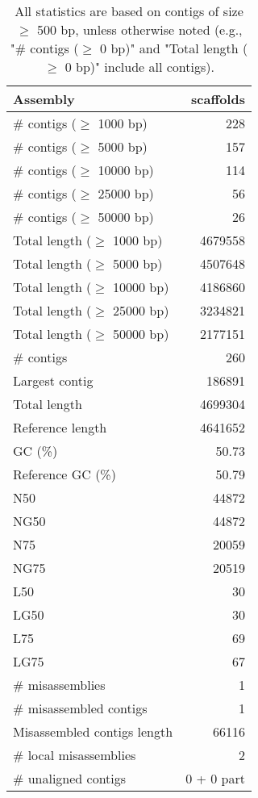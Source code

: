 \documentclass[12pt,a4paper]{article}
\begin{document}
\begin{table}[ht]
\begin{center}
\caption{All statistics are based on contigs of size $\geq$ 500 bp, unless otherwise noted (e.g., "\# contigs ($\geq$ 0 bp)" and "Total length ($\geq$ 0 bp)" include all contigs).}
\begin{tabular}{|l*{1}{|r}|}
\hline
Assembly & scaffolds \\ \hline
\# contigs ($\geq$ 1000 bp) & 228 \\ \hline
\# contigs ($\geq$ 5000 bp) & 157 \\ \hline
\# contigs ($\geq$ 10000 bp) & 114 \\ \hline
\# contigs ($\geq$ 25000 bp) & 56 \\ \hline
\# contigs ($\geq$ 50000 bp) & 26 \\ \hline
Total length ($\geq$ 1000 bp) & 4679558 \\ \hline
Total length ($\geq$ 5000 bp) & 4507648 \\ \hline
Total length ($\geq$ 10000 bp) & 4186860 \\ \hline
Total length ($\geq$ 25000 bp) & 3234821 \\ \hline
Total length ($\geq$ 50000 bp) & 2177151 \\ \hline
\# contigs & 260 \\ \hline
Largest contig & 186891 \\ \hline
Total length & 4699304 \\ \hline
Reference length & 4641652 \\ \hline
GC (\%) & 50.73 \\ \hline
Reference GC (\%) & 50.79 \\ \hline
N50 & 44872 \\ \hline
NG50 & 44872 \\ \hline
N75 & 20059 \\ \hline
NG75 & 20519 \\ \hline
L50 & 30 \\ \hline
LG50 & 30 \\ \hline
L75 & 69 \\ \hline
LG75 & 67 \\ \hline
\# misassemblies & 1 \\ \hline
\# misassembled contigs & 1 \\ \hline
Misassembled contigs length & 66116 \\ \hline
\# local misassemblies & 2 \\ \hline
\# unaligned contigs & 0 + 0 part \\ \hline

\end{tabular}
\end{center}
\end{table}
\end{document}
